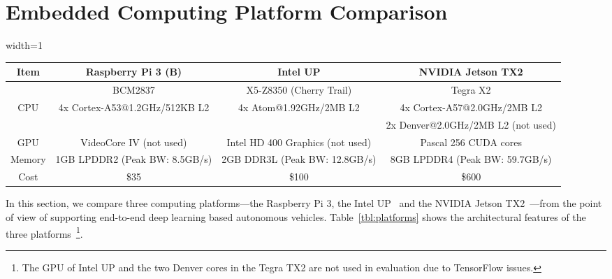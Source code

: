 
%

\section{Embedded Computing Platform Comparison}\label{sec:comparison}



\begin{table*}[h]
  \centering
  \begin{adjustbox}{width=1\textwidth}
  \begin{tabular}{|c|c|c|c|}
    \hline
    Item    & Raspberry Pi 3 (B)   & Intel UP                  & NVIDIA Jetson TX2\\
    \hline
            & BCM2837              & X5-Z8350 (Cherry Trail)   & Tegra X2 \\
    CPU     & 4x Cortex-A53@1.2GHz/512KB L2  &
              4x Atom@1.92GHz/2MB L2 &
              4x Cortex-A57@2.0GHz/2MB L2 \\
            &              &              & 2x Denver@2.0GHz/2MB L2 (not used)  \\
    \hline
    GPU     &  VideoCore IV (not used)    &
               Intel HD 400 Graphics (not used) &
               Pascal 256 CUDA cores   \\
    \hline
    Memory  & 1GB LPDDR2 (Peak BW: 8.5GB/s)  &  2GB DDR3L (Peak BW: 12.8GB/s)    & 8GB LPDDR4  (Peak BW: 59.7GB/s)            \\
	\hline
	Cost  & \$35 & \$100 & \$600 \\
	\hline
  \end{tabular}
  \end{adjustbox}
  \caption{Compared embedded computing platforms}
  \label{tbl:platforms}
\end{table*}

In this section, we compare three computing platforms---the Raspberry
Pi 3, the Intel UP~\cite{intelup} and the NVIDIA Jetson
TX2~\cite{nvidiajetson}---from the point of view of supporting
end-to-end deep learning based autonomous vehicles. 
Table~\ref{tbl:platforms} shows the architectural features of the three
platforms~\footnote{The GPU of Intel UP and the two Denver cores in the
  Tegra TX2 are not used in evaluation due to TensorFlow issues.}.
  
